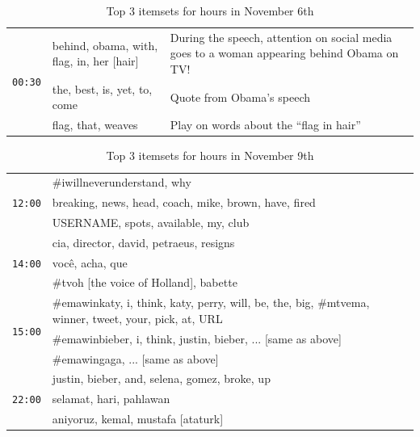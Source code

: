 \documentclass{sig-alternate}
\begin{document}
\begin{table}
\begin{center}
\begin{tabular}{|p{.6cm}|p{2.5cm}|p{5cm}|}
\multirow{3}{*}{\texttt{00:30}} 	& behind, obama, with, flag, in, her [hair]		&  During the speech, attention on social media goes to a woman appearing behind Obama on TV! \\ \cline{2-3}
					   	& the, best, is, yet, to, come		&  Quote from Obama's speech\\ \cline{2-3}
						& flag, that, weaves	& Play on words about the ``flag in hair'' \\\hline																			
\end{tabular}
\end{center}
\caption{Top 3 itemsets for hours in November 6th}
 \label{table:nov6}
\end{table}

\begin{table}

\begin{center}
\small
\def\arraystretch{1.1}
\begin{tabular}{|p{.6cm}|p{7.5cm}|}

\hline
\multirow{3}{*}{\texttt{12:00}} 
& \#iwillneverunderstand, why\\\cline{2-2}
& breaking, news, head, coach, mike, brown, have, fired  \\\cline{2-2}
& USERNAME, spots, available, my, club \\\hline
\multirow{3}{*}{\texttt{14:00}} 
& cia, director, david, petraeus, resigns \\\cline{2-2}
& voc\^{e}, acha, que \\\cline{2-2}
& \#tvoh [the voice of Holland], babette \\\hline
\multirow{3}{*}{\texttt{15:00}} & \#emawinkaty, i, think, katy, perry, will, be, the, big,  \#mtvema, winner, tweet, your, pick, at, URL
\\ \cline{2-2}
& \#emawinbieber, i, think, justin, bieber, ... [same as above] \\ \cline{2-2}
& \#emawingaga, ... [same as above]  \\\hline														
\multirow{3}{*}{\texttt{22:00}} & justin, bieber, and, selena, gomez, broke, up
\\ \cline{2-2}
& selamat, hari, pahlawan \\\cline{2-2}
& aniyoruz, kemal, mustafa [ataturk] \\ \hline
\end{tabular}
\end{center}
\caption{Top 3 itemsets for hours in November 9th}
 \label{table:nov9}
\end{table}
 
\end{document}
